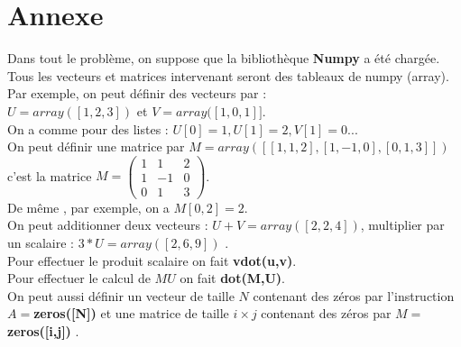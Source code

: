 \documentclass[10pt,fleqn]{article} %
\begin{document}
\ifprof
\else
\section{Annexe}
\noindent
Dans tout le problème, on suppose que la bibliothèque \textbf{Numpy} a été chargée.\\
Tous les vecteurs et matrices intervenant seront des tableaux de numpy (array).\\
Par exemple, on peut définir des vecteurs par :\\
 $U=array([1,2,3])$ et $V=array([1,0,1]]$.\\
On a comme pour des listes : $U[0]=1, U[1]=2, V[1]=0$...\\
On peut définir une matrice par $M=array([[1,1,2],[1,-1,0],[0,1,3]])$ c'est la matrice
 $M=\left(\begin{array}{ccc}1&1&2\\1&-1&0 \\ 0&1&3 \end{array} \right)$.\\
De même , par exemple, on a $M[0,2]=2$. \\
On peut additionner deux vecteurs : $U+V=array([2,2,4])$, multiplier par un scalaire :
$3*U=array([2,6,9])$ .\\
Pour effectuer le produit scalaire on fait \textbf{vdot(u,v)}.\\
Pour effectuer le calcul de $MU$ on fait \textbf{dot(M,U)}.\\
On peut aussi définir un vecteur de taille $N$ contenant des zéros par l'instruction 
$A=$\textbf{zeros([N])} et une matrice de taille $i\times j$ contenant des zéros par 
$M=$\textbf{zeros([i,j])} .
\fi
\end{document}
